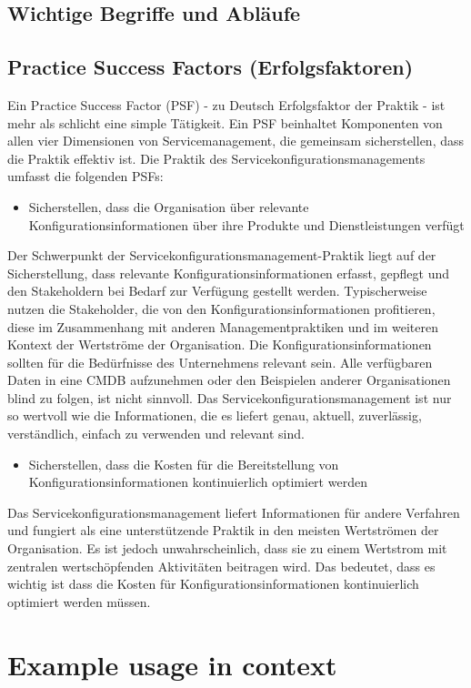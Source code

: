 \subsection{Wichtige Begriffe und Abläufe}
\subsection{Practice Success Factors (Erfolgsfaktoren)}
Ein Practice Success Factor (PSF) - zu Deutsch Erfolgsfaktor der Praktik -
ist mehr als schlicht eine simple Tätigkeit. Ein PSF beinhaltet Komponenten
von allen vier Dimensionen von Servicemanagement, die gemeinsam sicherstellen,
dass die Praktik effektiv ist. Die Praktik des Servicekonfigurationsmanagements umfasst die folgenden PSFs:

\begin{itemize}
	\item Sicherstellen, dass die Organisation über relevante Konfigurationsinformationen über ihre Produkte und Dienstleistungen verfügt
\end{itemize}

\noindent
Der Schwerpunkt der Servicekonfigurationsmanagement-Praktik liegt auf der Sicherstellung, dass relevante Konfigurationsinformationen
erfasst, gepflegt und den Stakeholdern bei Bedarf zur Verfügung gestellt werden.
Typischerweise nutzen die Stakeholder, die von den Konfigurationsinformationen profitieren, diese im Zusammenhang mit anderen
Managementpraktiken und im weiteren Kontext der Wertströme der Organisation.
Die Konfigurationsinformationen sollten für die Bedürfnisse des Unternehmens relevant sein. Alle verfügbaren
Daten in eine CMDB aufzunehmen oder den Beispielen anderer Organisationen blind zu folgen, ist nicht sinnvoll. Das
Servicekonfigurationsmanagement ist nur so wertvoll wie die Informationen, die es liefert
genau, aktuell, zuverlässig, verständlich, einfach zu verwenden und relevant sind.

\begin{itemize}
	\item Sicherstellen, dass die Kosten für die Bereitstellung von Konfigurationsinformationen kontinuierlich optimiert werden
\end{itemize}

\noindent
Das Servicekonfigurationsmanagement liefert Informationen für andere Verfahren und fungiert als
eine unterstützende Praktik in den meisten Wertströmen der Organisation. Es ist jedoch unwahrscheinlich, dass sie
zu einem Wertstrom mit zentralen wertschöpfenden Aktivitäten beitragen wird. Das bedeutet, dass es wichtig ist
dass die Kosten für Konfigurationsinformationen kontinuierlich optimiert werden müssen.

\section{Example usage in context}
